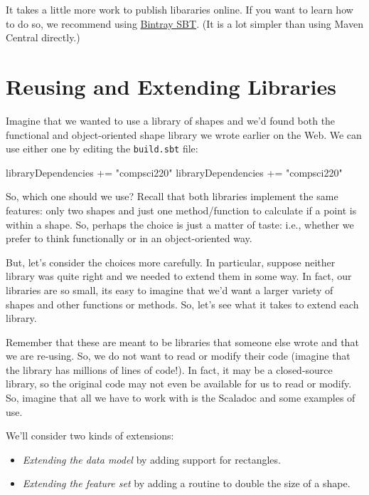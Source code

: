 \documentclass{book}
\begin{document}
It takes a little more work to publish libararies online.
If you want to learn how to do so, we recommend using
\href{https://github.com/softprops/bintray-sbt}{Bintray SBT}. (It is a lot
simpler than using Maven Central directly.)

\section{Reusing and Extending Libraries}

Imagine that we wanted to use a library of shapes and we'd found both the functional
and object-oriented shape library we wrote earlier on the Web. We can use
either one by editing the \texttt{build.sbt} file:

\begin{scalacode}
libraryDependencies += "compsci220" %
libraryDependencies += "compsci220" %
\end{scalacode}

So, which one should we use? Recall that both libraries implement the same
features: only two shapes and just one method/function to calculate if
a point is within a shape. So, perhaps the choice is just a matter of taste:
i.e., whether we prefer to think functionally or in an object-oriented way.

But, let's consider the choices more carefully. In particular, suppose neither
library was quite right and we needed to extend them in some way. In fact,
our libraries are so small, its easy to imagine that we'd want a larger
variety of shapes and other functions or methods. So, let's see what it
takes to extend each library.

Remember that these are meant to be libraries that someone else wrote and that
we are re-using. So, we do not want to read or modify their code (imagine that
the library has millions of lines of code!). In fact, it may be a closed-source
library, so the original code may not even be available for us to read or modify.
So, imagine that all we have to work with is the Scaladoc and some examples
of use.

We'll consider two kinds of extensions:

\begin{itemize}

  \item \emph{Extending the data model} by adding support for rectangles.

  \item \emph{Extending the feature set} by adding a routine to
  double the size of a shape.

\end{itemize}
\end{document}
